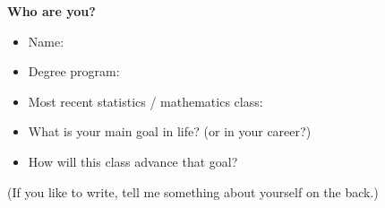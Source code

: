\documentclass[14pt]{extarticle}
\begin{document}
\centerline{\bf\large Who are you?}
\begin{itemize}
\item Name:
\item Degree program:
\item Most recent statistics / mathematics class:
\vspace{1.25in}
\item What is your main goal in life? (or in your career?)
\vspace{2.25in}
\item How will this class advance that goal?
\vspace{3.25in}
\end{itemize}
(If you like to write, tell me something about yourself on the back.)
\end{document}
